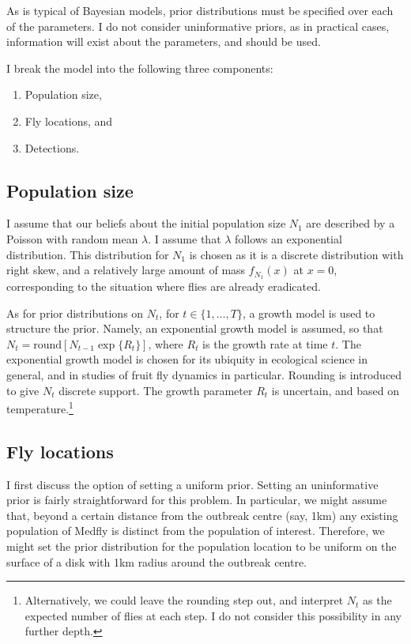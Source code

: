 \documentclass[
]{book}
\providecommand{\tightlist}{%
  \setlength{\itemsep}{0pt}\setlength{\parskip}{0pt}}
\begin{document}
As is typical of Bayesian models, prior distributions must be specified over each of the parameters. I do not consider uninformative priors, as in practical cases, information will exist about the parameters, and should be used.

I break the model into the following three components:

\begin{enumerate}
\def\labelenumi{\arabic{enumi}.}
\tightlist
\item
  Population size,
\item
  Fly locations, and
\item
  Detections.
\end{enumerate}

\hypertarget{population-size}{%
\subsection{Population size}\label{population-size}}

I assume that our beliefs about the initial population size \(N_1\) are described by a Poisson with random mean \(\lambda\). I assume that \(\lambda\) follows an exponential distribution. This distribution for \(N_1\) is chosen as it is a discrete distribution with right skew, and a relatively large amount of mass \(f_{N_1}(x)\) at \(x = 0\), corresponding to the situation where flies are already eradicated.

As for prior distributions on \(N_t\), for \(t \in \{1, \ldots, T\}\), a growth model is used to structure the prior. Namely, an exponential growth model is assumed, so that \(N_t = \mathrm{round}[N_{t-1} \exp\{R_t\}]\), where \(R_t\) is the growth rate at time \(t\). The exponential growth model is chosen for its ubiquity in ecological science in general, and in studies of fruit fly dynamics in particular. Rounding is introduced to give \(N_t\) discrete support. The growth parameter \(R_t\) is uncertain, and based on temperature.\footnote{Alternatively, we could leave the rounding step out, and interpret \(N_t\) as the expected number of flies at each step. I do not consider this possibility in any further depth.}

\hypertarget{fly-locations}{%
\subsection{Fly locations}\label{fly-locations}}

I first discuss the option of setting a uniform prior. Setting an uninformative prior is fairly straightforward for this problem. In particular, we might assume that, beyond a certain distance from the outbreak centre (say, 1km) any existing population of Medfly is distinct from the population of interest. Therefore, we might set the prior distribution for the population location to be uniform on the surface of a disk with 1km radius around the outbreak centre.
\end{document}
